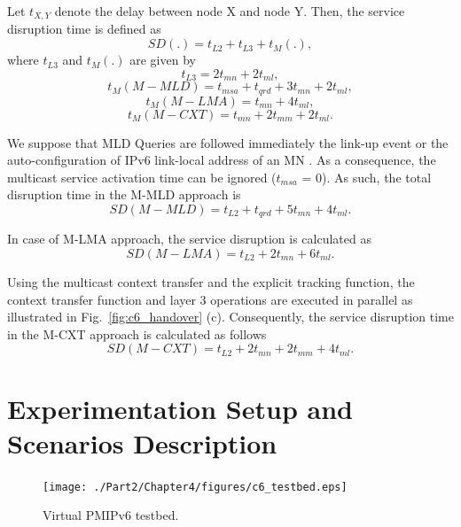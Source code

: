 Let $t_{X, Y}$ denote the delay between node X and node Y.  Then, the service disruption time is defined as \\
\begin{equation}
SD (.) = t_{L2} + t_{L3} + t_{M}(.),
\end{equation}
where $t_{L3}$ and $t_{M}(.)$ are given by\\
\begin{equation}
t_{L3} = 2t_{mn} + 2t_{ml}, 
\end{equation}
\begin{equation}
t_{M}(M-MLD) = t_{msa} + t_{qrd} + 3t_{mn} + 2t_{ml},
\end{equation}
\begin{equation}
t_{M}(M-LMA) = t_{mn} + 4t_{ml},
\end{equation}
\begin{equation}
t_{M}(M-CXT) = t_{mn} + 2t_{mm} +2t_{ml}.
\end{equation}

We suppose that MLD Queries are followed immediately the link-up event or the auto-configuration of IPv6 link-local address of an MN \cite{RFC_6224}. As a consequence, the multicast service activation time can be ignored ($t_{msa}$ = 0). As such, the total disruption time in the M-MLD approach is \\
\begin{equation}
SD(M-MLD) = t_{L2} + t_{qrd} + 5t_{mn} + 4t_{ml}.	
\label{eq:c6_total}
\end{equation}

In case of M-LMA approach, the service disruption is calculated as\\
\begin{equation}
SD(M-LMA) = t_{L2} + 2t_{mn} + 6t_{ml}. 	
\end{equation}

Using the multicast context transfer and the explicit tracking function, the context transfer function and layer 3 operations are executed in parallel as illustrated in Fig.~\ref{fig:c6_handover} (c). Consequently, the service disruption time in the M-CXT approach is calculated as follows\\
\begin{equation}
SD(M-CXT) = t_{L2} + 2t_{mn} + 2t_{mm} + 4t_{ml}. 	
\end{equation}

\section{Experimentation Setup and Scenarios Description} \label{section:testbed}
\begin{figure}[h!] 
 \begin{center} 
 \texttt{[image: ./Part2/Chapter4/figures/c6\_testbed.eps]} 
    \caption[PMIPv6 testbed for mobile multicast experimentation.]{Virtual PMIPv6 testbed.}
     \label{fig:c6_testbed}
  \end{center} 
\end{figure}

